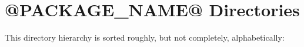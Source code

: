 \section{@PACKAGE\_\-NAME@ Directories}
This directory hierarchy is sorted roughly, but not completely, alphabetically:\begin{CompactList}
\item {}
\end{CompactList}
